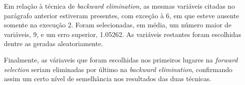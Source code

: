 \begin{enumerate}
\begin{enumerate}
		     \vspace{12pt}
		     
		     Em relação à técnica de \textit{backward elimination}, as mesmas
		     variáveis citadas no parágrafo anterior estiveram presentes, com exceção
		     à 6, em que esteve ausente somente na execução 2. Foram selecionadas, em
		     média, um número maior de variáveis, 9, e um erro superior, 1.05262. As
		     variáveis restantes foram escolhidas dentre as geradas aleatoriamente.
		     
		     \vspace{12pt}
		     
		     Finalmente, as váriaveis que foram escolhidas nos primeiros lugares na
		     \textit{forward selection} seriam eliminadas por último na
		     \textit{backward elimination}, confirmando assim um certo nível de
		     semelhância nos resultados das duas técnicas.
		     
		\end{enumerate}
\end{enumerate}
		  
